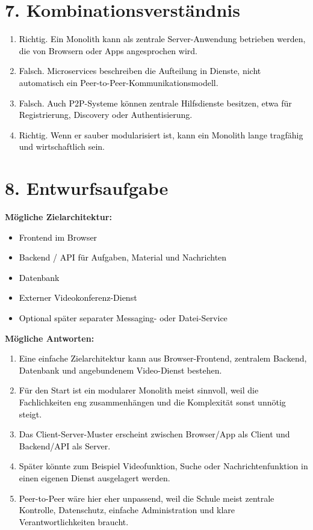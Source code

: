 \documentclass[11pt,a4paper]{article}
\newcommand{\solution}[1]{\textcolor{black}{#1}}
\begin{document}
\section*{7. Kombinationsverständnis}
\begin{enumerate}
  \item \solution{Richtig. Ein Monolith kann als zentrale Server-Anwendung betrieben werden, die von Browsern oder Apps angesprochen wird.}
  \item \solution{Falsch. Microservices beschreiben die Aufteilung in Dienste, nicht automatisch ein Peer-to-Peer-Kommunikationsmodell.}
  \item \solution{Falsch. Auch P2P-Systeme können zentrale Hilfsdienste besitzen, etwa für Registrierung, Discovery oder Authentisierung.}
  \item \solution{Richtig. Wenn er sauber modularisiert ist, kann ein Monolith lange tragfähig und wirtschaftlich sein.}
\end{enumerate}

\section*{8. Entwurfsaufgabe}
\textbf{Mögliche Zielarchitektur:}
\begin{itemize}
  \item \solution{Frontend im Browser}
  \item \solution{Backend / API für Aufgaben, Material und Nachrichten}
  \item \solution{Datenbank}
  \item \solution{Externer Videokonferenz-Dienst}
  \item \solution{Optional später separater Messaging- oder Datei-Service}
\end{itemize}

\textbf{Mögliche Antworten:}
\begin{enumerate}
  \item \solution{Eine einfache Zielarchitektur kann aus Browser-Frontend, zentralem Backend, Datenbank und angebundenem Video-Dienst bestehen.}
  \item \solution{Für den Start ist ein modularer Monolith meist sinnvoll, weil die Fachlichkeiten eng zusammenhängen und die Komplexität sonst unnötig steigt.}
  \item \solution{Das Client-Server-Muster erscheint zwischen Browser/App als Client und Backend/API als Server.}
  \item \solution{Später könnte zum Beispiel Videofunktion, Suche oder Nachrichtenfunktion in einen eigenen Dienst ausgelagert werden.}
  \item \solution{Peer-to-Peer wäre hier eher unpassend, weil die Schule meist zentrale Kontrolle, Datenschutz, einfache Administration und klare Verantwortlichkeiten braucht.}
\end{enumerate}
\end{document}
